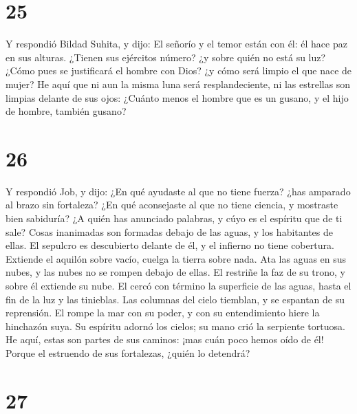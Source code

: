 \hypertarget{section-24}{%
\section{25}\label{section-24}}

 Y respondió Bildad Suhita, y dijo:  El
señorío y el temor están con él: él hace paz en sus alturas.
 ¿Tienen sus ejércitos número? ¿y sobre quién no está su
luz?  ¿Cómo pues se justificará el hombre con Dios? ¿y
cómo será limpio el que nace de mujer?  He aquí que ni aun
la misma luna será resplandeciente, ni las estrellas son limpias delante
de sus ojos:  ¿Cuánto menos el hombre que es un gusano, y
el hijo de hombre, también gusano?

\hypertarget{section-25}{%
\section{26}\label{section-25}}

 Y respondió Job, y dijo:  ¿En qué ayudaste
al que no tiene fuerza? ¿has amparado al brazo sin fortaleza?
 ¿En qué aconsejaste al que no tiene ciencia, y mostraste
bien sabiduría?  ¿A quién has anunciado palabras, y cúyo
es el espíritu que de ti sale?  Cosas inanimadas son
formadas debajo de las aguas, y los habitantes de ellas. 
El sepulcro es descubierto delante de él, y el infierno no tiene
cobertura.  Extiende el aquilón sobre vacío, cuelga la
tierra sobre nada.  Ata las aguas en sus nubes, y las
nubes no se rompen debajo de ellas.  El restriñe la faz de
su trono, y sobre él extiende su nube.  El cercó con
término la superficie de las aguas, hasta el fin de la luz y las
tinieblas.  Las columnas del cielo tiemblan, y se
espantan de su reprensión.  El rompe la mar con su poder,
y con su entendimiento hiere la hinchazón suya.  Su
espíritu adornó los cielos; su mano crió la serpiente tortuosa.
 He aquí, estas son partes de sus caminos: ¡mas cuán poco
hemos oído de él! Porque el estruendo de sus fortalezas, ¿quién lo
detendrá?

\hypertarget{section-26}{%
\section{27}\label{section-26}}

